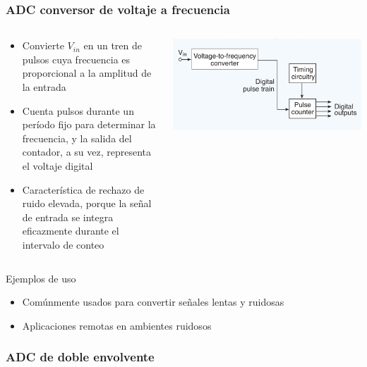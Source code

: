 \documentclass{beamer}
\begin{document}
\begin{frame}
\frametitle{ADC conversor de voltaje a frecuencia}
  \begin{columns}
    \begin{column}{0.65\textwidth}
        \begin{itemize}
          \item {\color{blue} Convierte $V_{in}$ en un tren de pulsos cuya
frecuencia es proporcional a la amplitud de la entrada}
          \item Cuenta pulsos durante {\color{blue}un período fijo} para determinar la
frecuencia, y la salida del contador, a su vez, representa el voltaje digital
          \item \alert{Característica de rechazo de ruido elevada}, porque la
señal de entrada se integra eficazmente durante el intervalo de conteo 
        \end{itemize}
    \end{column} 
    \begin{column}{0.35\textwidth}
      \includegraphics[width=\textwidth]{d3/adc_v_to_f}
    \end{column}
  \end{columns}
      \begin{alertblock}{Ejemplos de uso}
        \begin{itemize}
          \item Comúnmente usados para convertir señales lentas y ruidosas 
          \item Aplicaciones remotas en ambientes ruidosos   
        \end{itemize}
      \end{alertblock}
\end{frame}

\subsubsection{ADC de doble envolvente}
\end{document}
